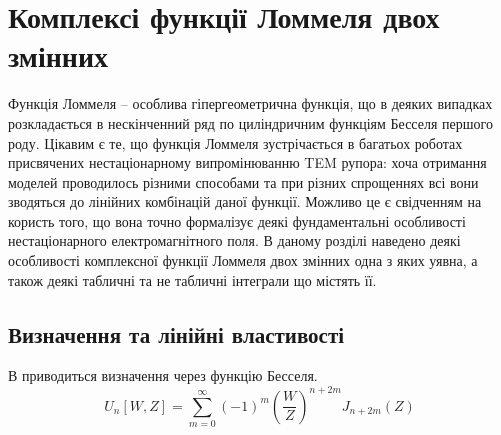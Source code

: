 \chapter{Комплексі функції Ломмеля двох змінних}
\label{ch:lommel}

Функція Ломмеля -- особлива гіпергеометрична функція, що в деяких випадках 
розкладається в нескінченний ряд по циліндричним функціям Бесселя першого роду.
Цікавим є те, що функція Ломмеля зустрічається в багатьох роботах присвячених
нестаціонарному випромінюванню TEM рупора: хоча отримання моделей проводилось 
різними способами та при різних спрощеннях всі вони зводяться до лінійних 
комбінацій даної функції. Можливо це є свідченням на користь того, що вона 
точно формалізує деякі фундаментальні особливості нестаціонарного 
електромагнітного поля. В даному розділі наведено деякі особливості 
комплексної функції Ломмеля двох змінних одна з яких уявна, а також деякі 
табличні та не табличні інтеграли що містять її. 

\section{Визначення та лінійні властивості}

В \cite{imp:Boersma1961} приводиться визначення через функцію Бесселя.
%
\begin{equation}
U_n \left[ W, Z \right] = \sum \limits_{m = 0}^{\infty} (-1)^m
\left( \frac{W}{Z} \right)^{n + 2m} J_{n + 2m} (Z)
\end{equation}

